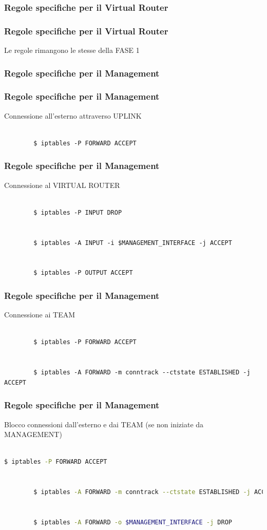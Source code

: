 \documentclass{beamer}
\begin{document}
\subsubsection{Regole specifiche per il Virtual Router}
\begin{frame}[fragile]
    \frametitle{Regole specifiche per il Virtual Router}
    Le regole rimangono le stesse della FASE 1
\end{frame}


\subsubsection{Regole specifiche per il Management}
\begin{frame}[fragile]
    \frametitle{Regole specifiche per il Management}
    Connessione all'esterno attraverso UPLINK
    \\~\\
    \begin{lstlisting}
        $ iptables -P FORWARD ACCEPT
    \end{lstlisting}
\end{frame}

\begin{frame}[fragile]
    \frametitle{Regole specifiche per il Management}
    Connessione al VIRTUAL ROUTER
    \\~\\
    \begin{lstlisting}
        $ iptables -P INPUT DROP
        
        
        $ iptables -A INPUT -i $MANAGEMENT_INTERFACE -j ACCEPT
        
        
        $ iptables -P OUTPUT ACCEPT

    \end{lstlisting}
\end{frame}

\begin{frame}[fragile]
    \frametitle{Regole specifiche per il Management}
    Connessione ai TEAM
    \\~\\
    \begin{lstlisting}
        $ iptables -P FORWARD ACCEPT
        
        
        $ iptables -A FORWARD -m conntrack --ctstate ESTABLISHED -j ACCEPT
    \end{lstlisting}
\end{frame}

\begin{frame}[fragile]
    \frametitle{Regole specifiche per il Management}
    Blocco connessioni dall'esterno e dai TEAM (se non iniziate da MANAGEMENT)
    \\~\\
    \begin{lstlisting}[language=sh]
        $ iptables -P FORWARD ACCEPT 
        
        
        $ iptables -A FORWARD -m conntrack --ctstate ESTABLISHED -j ACCEPT
        
        
        $ iptables -A FORWARD -o $MANAGEMENT_INTERFACE -j DROP        
    \end{lstlisting}
\end{frame}
\end{document}
